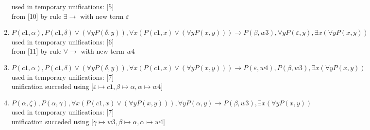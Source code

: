 \begin{enumerate}
  used in temporary unifications: [5]\\
 from [10] by rule $\exists \rightarrow $ with new term $\varepsilon$
\item $P(c1, \alpha), P(c1, \delta)  \vee  ( \forall  y P(\delta, y)),  \forall  x (P(c1, x)  \vee  ( \forall  y P(x, y))) \rightarrow  P(\beta, w3),  \forall  y P(\varepsilon, y),  \exists  x ( \forall  y P(x, y))$\\
  used in temporary unifications: [6]\\
 from [11] by rule $\forall \rightarrow $ with new term $w4$
\item $P(c1, \alpha), P(c1, \delta)  \vee  ( \forall  y P(\delta, y)),  \forall  x (P(c1, x)  \vee  ( \forall  y P(x, y))) \rightarrow  P(\varepsilon, w4), P(\beta, w3),  \exists  x ( \forall  y P(x, y))$\\
  used in temporary unifications: [7]\\ 
 unification succeded using [$\varepsilon \mapsto c1, \beta \mapsto \alpha, \alpha \mapsto w4$]
\item $P(\alpha, \zeta), P(\alpha, \gamma),  \forall  x (P(c1, x)  \vee  ( \forall  y P(x, y))),  \forall  y P(\alpha, y) \rightarrow  P(\beta, w3),  \exists  x ( \forall  y P(x, y))$\\
  used in temporary unifications: [7]\\ 
 unification succeded using [$\gamma \mapsto w3, \beta \mapsto \alpha, \alpha \mapsto w4$]
\end{enumerate}
